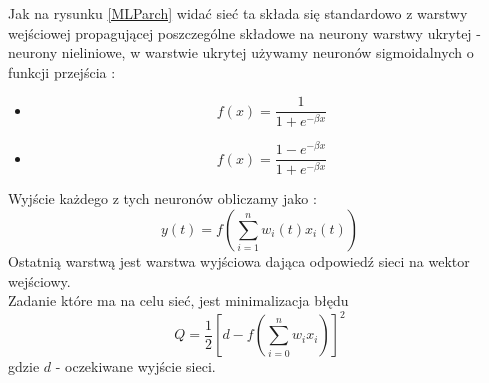 \documentclass{classrep}
\begin{document}
Jak na rysunku \ref{MLParch} widać  sieć ta składa się standardowo z warstwy wejściowej propagującej poszczególne składowe na neurony warstwy ukrytej - neurony nieliniowe, w warstwie ukrytej używamy neuronów sigmoidalnych o funkcji przejścia :
\begin{itemize}
\item 
\begin{equation}
f(x) = \frac{1}{1+ e ^{- \beta x }}
\end{equation}
\item 
\begin{equation}
f(x) = \frac{1- e ^{- \beta x }}{1+ e ^{- \beta x }}
\end{equation}
\end{itemize}
Wyjście każdego z tych neuronów obliczamy jako :
\begin{equation}
y(t) = f \left( \sum \limits ^{n} _{i=1} w_{i}(t) x_{i} (t) \right)
\end{equation}
Ostatnią warstwą jest warstwa wyjściowa dająca odpowiedź sieci na wektor wejściowy.\\
Zadanie które ma na celu sieć, jest minimalizacja błędu 
\begin{equation}
Q = \frac{1}{2} \left[ d - f \left( \sum \limits ^{n} _{i=0} w_i x_i \right)  \right] ^{2}
\end{equation}
gdzie $d$ - oczekiwane wyjście sieci.\\
\end{document}
